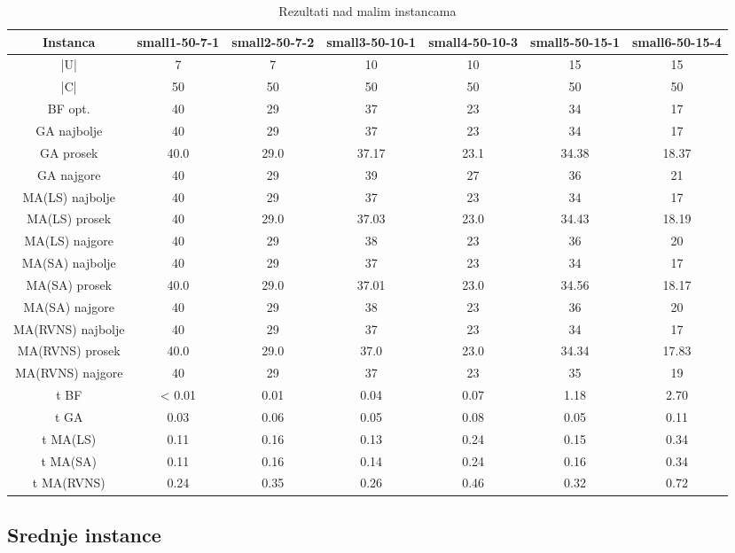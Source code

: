 \documentclass[12pt, a4paper]{article}
\theoremstyle{definition}
\begin{document}
\begin{table}[H]
\label{tab:1}
\begin{adjustbox}{width=\columnwidth,center}
\begin{tabular}{ |c|c|c|c|c|c|c| }
\hline
Instanca & small1-50-7-1 & small2-50-7-2 & small3-50-10-1 & small4-50-10-3 & small5-50-15-1 & small6-50-15-4 \\
\hline
|U| & 7 & 7 & 10 & 10 & 15 & 15 \\
\hline
|C| & 50 & 50 & 50 & 50 & 50 & 50 \\
\hline
BF opt. & 40 & 29 & 37 & 23 & 34 & 17 \\
\hline
GA najbolje & 40 & 29 & 37 & 23 & 34 & 17 \\
\hline
GA prosek & 40.0 & 29.0 & 37.17 & 23.1 & 34.38 & 18.37 \\
\hline
GA najgore & 40 & 29 & 39 & 27 & 36 & 21 \\
\hline
MA(LS) najbolje & 40 & 29 & 37 & 23 & 34 & 17 \\
\hline
MA(LS) prosek & 40 & 29.0 & 37.03 & 23.0 & 34.43 & 18.19 \\
\hline
MA(LS) najgore & 40 & 29 & 38 & 23 & 36 & 20 \\
\hline
MA(SA) najbolje & 40 & 29 & 37 & 23 & 34 & 17 \\
\hline
MA(SA) prosek & 40.0 & 29.0 & 37.01 & 23.0 & 34.56 & 18.17 \\
\hline
MA(SA) najgore & 40 & 29 & 38 & 23 & 36 & 20 \\
\hline
MA(RVNS) najbolje & 40 & 29 & 37 & 23 & 34 & 17 \\
\hline
MA(RVNS) prosek & 40.0 & 29.0 & 37.0 & 23.0 & 34.34 & 17.83 \\
\hline
MA(RVNS) najgore & 40 & 29 & 37 & 23 & 35 & 19 \\
\hline
t BF & < 0.01 & 0.01 & 0.04 & 0.07 & 1.18 & 2.70 \\
\hline
t GA & 0.03 & 0.06 & 0.05 & 0.08 & 0.05 & 0.11 \\
\hline
t MA(LS) & 0.11 & 0.16 & 0.13 & 0.24 & 0.15 & 0.34 \\
\hline
t MA(SA) & 0.11 & 0.16 & 0.14 & 0.24 & 0.16 & 0.34 \\
\hline
t MA(RVNS) & 0.24 & 0.35 & 0.26 & 0.46 & 0.32 & 0.72 \\
\hline
\end{tabular}
\end{adjustbox}
\caption{Rezultati nad malim instancama}
\end{table}

\subsection{Srednje instance}
\end{document}
